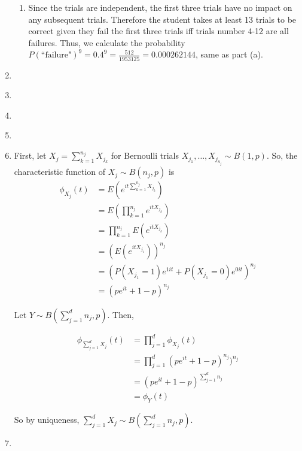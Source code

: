 \documentclass{article}
\begin{document}
\begin{enumerate}[label=\textbf{Question \arabic*.}]
\begin{enumerate}[label=(\alph*)]
				\item Since the trials are independent, the first three trials have no impact on any subsequent trials. Therefore the student takes at least 13 trials to be correct given they fail the first three trials iff trials number 4-12 are all failures. Thus, we calculate the probability $P(\mbox{``failure"})^{9}=0.4^{9}=\frac{512}{1953125}=0.000262144$, same as part (a).
			\end{enumerate}
			
			\item ~
			
			\item ~
			
			\item ~
			
			\item ~
			
			\newpage			
			
			\item First, let $X_j=\sum_{k=1}^{n_j}{X_{j_k}}$ for Bernoulli trials $X_{j_1}, \dots, X_{j_{n_j}}\sim B(1, p)$. So, the characteristic function of $X_j\sim B(n_j, p)$ is
			\begin{align*}
				\phi_{X_j}(t)&=E(e^{it\sum_{k=1}^{n_j}X_{j_k}})\\
				&=E(\prod_{k=1}^{n_j}e^{itX_{j_k}})\\
				&=\prod_{k=1}^{n_j}E(e^{itX_{j_k}})\\
				&=(E(e^{itX_{j_1}}))^{n_j}\\
				&=(P(X_{j_1}=1)e^{1it}+P(X_{j_1}=0)e^{0it})^{n_j}\\
				&=(pe^{it}+1-p)^{n_j}
			\end{align*}
			
			Let $Y\sim B(\sum_{j=1}^dn_j, p)$. Then,
			
			\begin{align*}
				\phi_{\sum_{j=1}^dX_j}(t)&=\prod_{j=1}^d\phi_{X_j}(t)\\
				&=\prod_{j=1}^d(pe^{it}+1-p)^{n_j})^{n_j}\\
				&=(pe^{it}+1-p)^{\sum_{j=1}^{d}n_j}\\
				&=\phi_Y(t)
			\end{align*}
			
			So by uniqueness, $\sum_{j=1}^dX_j\sim B(\sum_{j=1}^dn_j, p)$.
			
			\item ~
		\end{enumerate}
\end{document}

